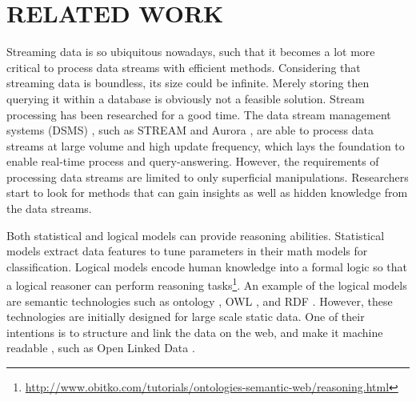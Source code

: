 
\chapter{RELATED WORK}
Streaming data is so ubiquitous nowadays, such that it becomes a lot more critical to process data streams with efficient methods.
Considering that streaming data is boundless, its size could be infinite. 
Merely storing then querying it within a database is obviously not a feasible solution.
Stream processing \cite{stephens1997survey} has been researched for a good time.
The data stream management systems (DSMS) \cite{cugola2012processing}, such as STREAM \cite{arasu2003stream} and Aurora \cite{abadi2003aurora}, are able to process data streams at large volume and high update frequency, which lays the foundation to enable real-time process and query-answering. 
However, the requirements of processing data streams are limited to only superficial manipulations.
Researchers start to look for methods that can gain insights as well as hidden knowledge from the data streams.

Both statistical and logical models can provide reasoning abilities. 
Statistical models extract data features to tune parameters in their math models for classification. 
Logical models encode human knowledge into a formal logic so that a logical reasoner can perform reasoning tasks\footnote{\url{http://www.obitko.com/tutorials/ontologies-semantic-web/reasoning.html}}.
An example of the logical models are semantic technologies such as ontology \cite{noy2001ontology}, OWL \cite{bechhofer2009owl}, and RDF \cite{lassila1999resource}.
However, these technologies are initially designed for large scale static data.
One of their intentions is to structure and link the data on the web, and make it machine readable \cite{berners2001semantic}, such as Open Linked Data \cite{bizer2009linked}.

